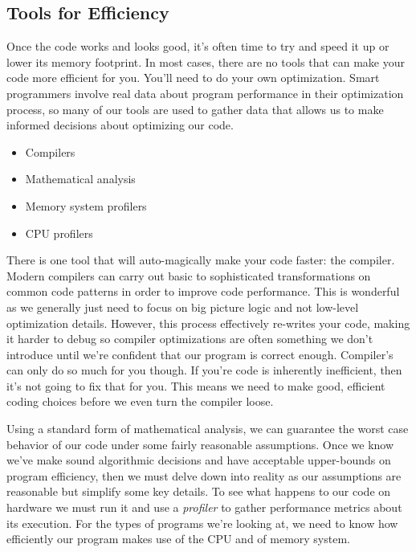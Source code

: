 \documentclass[]{tufte-handout}
\begin{document}
\subsection{Tools for Efficiency}

Once the code works and looks good, it's often time to try and speed it up or lower its memory footprint. In most cases, there are no tools that can make your code more efficient for you. You'll need to do your own optimization. Smart programmers involve real data about program performance in their optimization process, so many of our tools are used to gather data that allows us to make informed decisions about optimizing our code.
\begin{itemize}
\item Compilers
\item Mathematical analysis
\item Memory system profilers
\item CPU profilers
\end{itemize}

There is one tool that will auto-magically make your code faster: the compiler.  Modern compilers can carry out basic to sophisticated transformations on common code patterns in order to improve code performance.  This is wonderful as we generally just need to focus on big picture logic and not low-level optimization details. However, this process effectively re-writes your code, making it harder to debug so compiler optimizations are often something we don't introduce until we're confident that our program is correct enough.  Compiler's can only do so much for you though. If you're code is inherently inefficient, then it's not going to fix that for you.  This means we need to make good, efficient coding choices before we even turn the compiler loose.   

Using a standard form of mathematical analysis, we can guarantee the worst case behavior of our code under some fairly reasonable assumptions. Once we know we've make sound algorithmic decisions and have acceptable upper-bounds on program efficiency, then we must delve down into reality as our assumptions are reasonable but simplify some key details. To see what happens to our code on hardware we must run it and use a \textit{profiler} to gather performance metrics about its execution.  For the types of programs we're looking at, we need to know how efficiently our program makes use of the CPU and of memory system.
\end{document}
